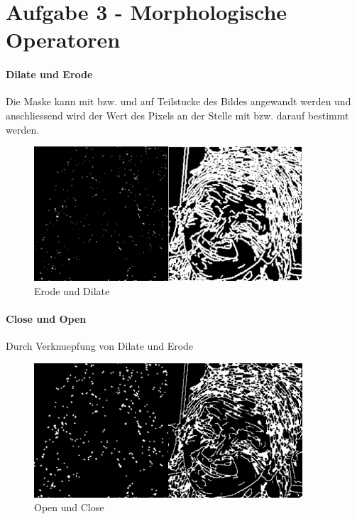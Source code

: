 \section*{Aufgabe 3 - Morphologische Operatoren}
\paragraph{Dilate und Erode}
Die Maske kann mit \lstinline@and@ bzw. \lstinline@or@ und  \lstinline@not@ auf Teilstucke des Bildes angewandt werden und anschliessend
wird der Wert des Pixels an der Stelle mit \lstinline@any@ bzw. \lstinline@all@ darauf bestimmt werden.

\begin{figure}[H]
\begin{center}
\includegraphics[width=100mm]{u06/t3-ed.eps}
\end{center}
\caption{Erode und Dilate}
\end{figure}

\paragraph{Close und Open}
Durch Verknuepfung von Dilate und Erode

\begin{figure}[H]
\begin{center}
\includegraphics[width=100mm]{u06/t3-co.eps}
\end{center}
\caption{Open und Close}
\end{figure}


